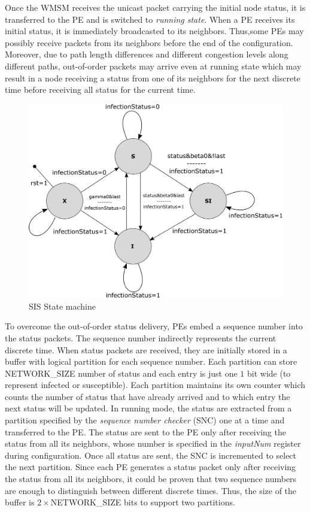 Once the WMSM receives the unicast packet carrying the initial node status, it is transferred to the PE and is switched to \emph{running state}. 
When a PE receives its initial status, it is immediately broadcasted to its neighbors.
Thus,some PEs may possibly receive packets from its neighbors before the end of the configuration. 
Moreover, due to path length differences and different congestion levels along different paths, out-of-order packets may arrive even at running state which may result in a node receiving a status from one of its neighbors for the next discrete time before receiving all status for the current time. 


\begin{figure}[t!]
    \begin{center}
    \includegraphics[width=0.7\columnwidth]{Figures/ISSM.pdf}
    \caption{SIS State machine} 
    \label{figure:fsm}
    \end{center}
    \vspace{-5mm}
\end{figure}

To overcome the out-of-order status delivery, PEs embed a sequence number into the status packets.
The sequence number indirectly represents the current discrete time.
When status packets are received, they are initially stored in a buffer with logical partition for each sequence number.
Each partition can store NETWORK\_SIZE number of status and each entry is just one $1$ bit wide (to represent infected or susceptible).  
Each partition maintains its own counter which counts the number of status that have already arrived and to which entry the next status will be updated. 
In running mode, the status are extracted from a partition specified by the \emph{sequence number checker} (SNC) one at a time and transferred to the PE.
The status are sent to the PE only after receiving the status from all its neighbors, whose number is specified in the \emph{inputNum} register during configuration.
Once all status are sent, the SNC is incremented to select the next partition.
Since each PE generates a status packet only after receiving the status from all its neighbors, it could be proven that two sequence numbers are enough to distinguish between different discrete times. 
Thus, the size of the buffer is $2 \times $NETWORK\_SIZE bits to support two partitions.

